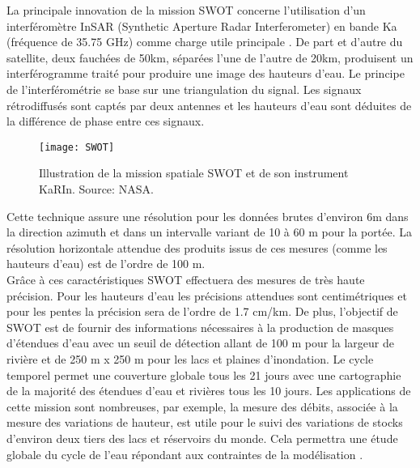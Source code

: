 \noindent La principale innovation de la mission SWOT concerne l'utilisation d'un interféromètre InSAR (Synthetic Aperture Radar Interferometer) en bande Ka (fréquence de 35.75 GHz) comme charge utile principale \citep[figure \ref{fig_swot},][]{biancamaria2016}. De part et d'autre du satellite, deux fauchées de 50km, séparées l'une de l'autre de 20km, produisent un interférogramme traité pour produire une image des hauteurs d'eau. Le principe de l'interférométrie se base sur une triangulation du signal. Les signaux rétrodiffusés sont captés par deux antennes et les hauteurs d'eau sont déduites de la différence de phase entre ces signaux.\\
\begin{figure}[h!]
    \centering
    \texttt{[image: SWOT]}     
    \caption{Illustration de la mission spatiale SWOT et de son instrument KaRIn. Source: NASA.}  
    \label{fig_swot}
\end{figure}

\noindent Cette technique assure une résolution pour les données brutes d'environ 6m dans la direction azimuth et dans un intervalle variant de 10 à 60 m pour la portée. La résolution horizontale attendue des produits issus de ces mesures (comme les hauteurs d'eau) est de l'ordre de 100 m.\\
Grâce à ces caractéristiques SWOT effectuera des mesures de très haute précision. Pour les hauteurs d'eau les précisions attendues sont centimétriques et pour les pentes la précision sera de l'ordre de 1.7 cm/km. De plus, l'objectif de SWOT est de fournir des informations nécessaires à la production de masques d'étendues d'eau avec un seuil de détection allant de 100 m pour la largeur de rivière et de 250 m x 250 m pour les lacs et plaines d'inondation. Le cycle temporel permet une couverture globale tous les 21 jours avec une cartographie de la majorité des étendues d'eau et rivières tous les 10 jours. Les applications de cette mission sont nombreuses, par exemple, la mesure des débits, associée à la mesure des variations de hauteur, est utile pour le suivi des variations de stocks d'environ deux tiers des lacs et réservoirs du monde. Cela permettra une étude globale du cycle de l'eau répondant aux contraintes de la modélisation \citep{biancamaria2016,cretaux2016}.\\

